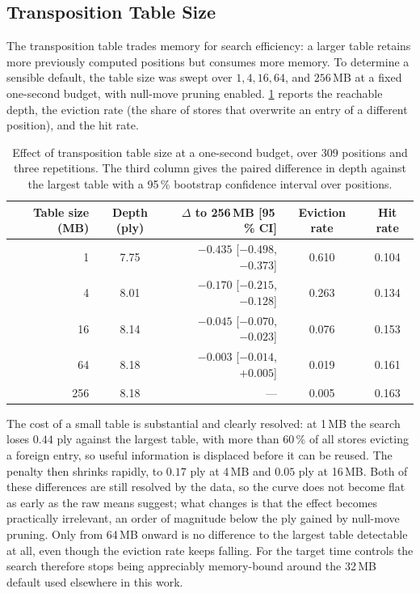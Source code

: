 \subsection{Transposition Table Size}
\label{subsec:eval_tt_size}

The transposition table trades memory for search efficiency: a larger table
retains more previously computed positions but consumes more memory. To determine
a sensible default, the table size was swept over $1, 4, 16, 64$, and $256$\,MB
at a fixed one-second budget, with null-move pruning enabled.
\cref{tab:tt_size} reports the reachable depth, the eviction rate (the share of
stores that overwrite an entry of a different position), and the hit rate.

\begin{table}[ht]
\centering
\begin{tabular}{@{}rcrcc@{}}
\toprule
Table size (MB) & Depth (ply) & $\Delta$ to 256\,MB [95\,\% CI] & Eviction rate & Hit rate \\ \midrule
1   & 7.75 & $-0.435$ [$-0.498$, $-0.373$] & 0.610 & 0.104 \\
4   & 8.01 & $-0.170$ [$-0.215$, $-0.128$] & 0.263 & 0.134 \\
16  & 8.14 & $-0.045$ [$-0.070$, $-0.023$] & 0.076 & 0.153 \\
64  & 8.18 & $-0.003$ [$-0.014$, $+0.005$] & 0.019 & 0.161 \\
256 & 8.18 & --- & 0.005 & 0.163 \\ \bottomrule
\end{tabular}
\caption{Effect of transposition table size at a one-second budget, over 309
positions and three repetitions. The third column gives the paired difference in
depth against the largest table with a 95\,\% bootstrap confidence interval over
positions.}
\label{tab:tt_size}
\end{table}

The cost of a small table is substantial and clearly resolved: at 1\,MB the search
loses $0.44$ ply against the largest table, with more than $60\,\%$ of all stores
evicting a foreign entry, so useful information is displaced before it can be
reused. The penalty then shrinks rapidly, to $0.17$ ply at 4\,MB and $0.05$ ply at
16\,MB. Both of these differences are still resolved by the data, so the curve
does not become flat as early as the raw means suggest; what changes is that the
effect becomes practically irrelevant, an order of magnitude below the ply gained
by null-move pruning. Only from 64\,MB onward is no difference to the largest
table detectable at all, even though the eviction rate keeps falling. For the
target time controls the search therefore stops being appreciably memory-bound
around the 32\,MB default used elsewhere in this work.

